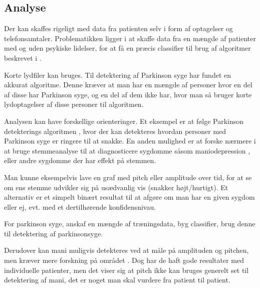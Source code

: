 \subsection{Analyse}
\begin{description}[style=nextline]
	\item[Har vi data nok?]
	Der kan skaffes rigeligt med data fra patienten selv i form af optagelser og telefonsamtaler. Problematikken ligger i at skaffe data fra en mængde af patienter med og uden psykiske lidelser, for at få en præcis classifier til brug af algoritmer beskrevet i \citep{6168572,6346375}.
	
	\item[Hvilke data skal benyttes?]
	Korte lydfiler kan bruges. Til detektering af Parkinson syge har \citep{6168572} fundet en akkurat algoritme. Denne kræver at man har en mængde af personer hvor en del af disse har Parkinson syge, og en del af dem ikke har, hvor man så bruger korte lydoptagelser af disse personer til algoritmen.
	
	\item[Formål med analysen]
	Analysen kan have forskellige orienteringer. Et eksempel er at følge Parkinson detekterings algoritmen \citep{6168572}, hvor der kan detekteres hvordan personer med Parkinson syge er ringere til at snakke.
	En anden mulighed er at forske nærmere i at bruge stemmeanalyse til at diagnosticere sygdomme såsom maniodepression \citep{6346375}, eller andre sygdomme der har effekt på stemmen.

	\item[Idé til visualisering]
	Man kunne eksempelvis lave en graf med pitch eller amplitude over tid, for at se om ens stemme udvikler sig på usædvanlig vis (snakker højt/hurtigt).
	Et alternativ er et simpelt binært resultat til at afgøre om man har en given sygdom eller ej, evt. med et dertilhørende konfidensnivau.
	\item[Oprids fremgangsmåde]
	For parkinson syge, anskaf en mængde af træningsdata, byg classifier, brug denne til detektering af parkinsonsyge.
	
	Derudover kan mani muligvis detekteres ved at måle på amplituden og pitchen, men kræver mere forskning på området \citep{6346375}.
	Dog har de haft gode resultater med individuelle patienter, men det viser sig at pitch ikke kan bruges generelt set til detektering af mani, det er noget man skal vurdere fra patient til patient.
	
\end{description}
